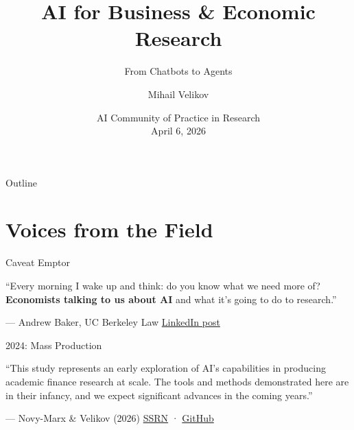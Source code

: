\documentclass[aspectratio=169, 11pt]{beamer}
\title{AI for Business \& Economic Research}
\subtitle{From Chatbots to Agents}
\author{Mihail Velikov}
\institute{Penn State --- Smeal College of Business}
\date{AI Community of Practice in Research\\ April 6, 2026}
\newcommand{\emphgold}[1]{\alert{\textbf{#1}}}
\newcommand{\sourceref}[1]{\vspace{0.15cm}\hfill{\tiny\textcolor{medgray}{#1}}}
\begin{document}
\begin{frame}[plain]
\titlepage
\end{frame}

\begin{frame}{Outline}
\tableofcontents
\end{frame}

\section{Voices from the Field}

\begin{frame}{Caveat Emptor}
\vfill
\begin{bigquote}
\Large
``Every morning I wake up and think: do you know what we need more of? \emphgold{Economists talking to us about AI} and what it's going to do to research.''
\end{bigquote}
\vspace{0.5cm}
\hfill\textcolor{medgray}{\normalsize --- Andrew Baker, UC Berkeley Law}
\sourceref{\href{https://www.linkedin.com/posts/andrew-baker-09bb6326_every-morning-i-wake-up-and-think-do-you-activity-7442585905145520128-1xy9}{LinkedIn post}}
\vfill
\end{frame}

\begin{frame}{2024: Mass Production}
\vfill
\begin{bigquote}
\large
``This study represents an early exploration of AI’s capabilities in producing academic finance research at scale. The tools and methods demonstrated here are in their infancy, and we expect significant advances in the coming years.''
\end{bigquote}
\vspace{0.5cm}
\hfill\textcolor{medgray}{\normalsize --- Novy-Marx \& Velikov (2026)}
\sourceref{\href{https://papers.ssrn.com/sol3/papers.cfm?abstract_id=5060022}{SSRN} · \href{https://github.com/velikov-mihail/AI-Powered-Scholarship}{GitHub}}
\vfill
\end{frame}
\end{document}
